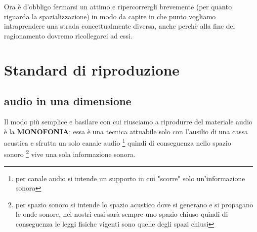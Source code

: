 \documentclass[12pt,a4paper]{report}
\begin{document}
Ora è d'obbligo fermarsi un attimo e ripercorrergli brevemente (per quanto riguarda la spazializzazione) in modo da capire in che punto vogliamo intraprendere una strada concettualmente diversa, anche perchè alla fine del ragionamento dovremo ricollegarci ad essi.








\section{Standard di riproduzione}\label{metodi}

\subsection{audio in una dimensione}
Il modo più semplice e basilare con cui riusciamo a riprodurre del materiale audio è la \textbf{MONOFONIA}; essa è una tecnica attuabile solo con l'ausilio di una cassa acustica e sfrutta un solo canale audio \footnote{per canale audio si intende un supporto in cui "scorre" solo un'informazione sonora}
quindi di conseguenza nello spazio sonoro \footnote{per spazio sonoro si intende lo spazio acustico dove si generano e si propagano le onde sonore, nei nostri casi sarà sempre uno spazio chiuso quindi di conseguenza le leggi fisiche vigenti sono quelle degli spazi chiusi} vive una sola informazione sonora.
\end{document}

